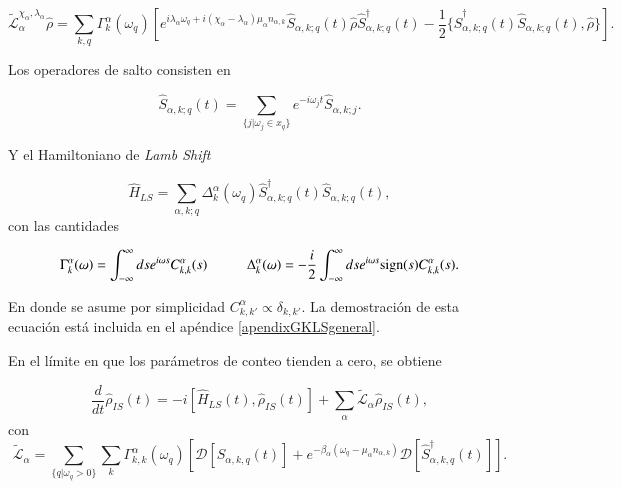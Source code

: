\begin{equation*}
    \tilde{\mathcal{L}}^{\chi_{\alpha},\lambda_{\alpha}}_{\alpha}\hat{\rho} = \sum_{k,q}\Gamma^{\alpha}_{k}(\omega_{q}) \left[e^{i\lambda_{\alpha}\omega_{q} + i(\chi_{\alpha}-\lambda_{\alpha})\mu_{\alpha}n_{\alpha,k}}\hat{S}_{\alpha,k;q}(t)\hat{\rho}\hat{S}^{\dagger}_{\alpha,k;q}(t) - \frac{1}{2}\{\hat{S}^{\dagger}_{\alpha,k;q}(t)\hat{S}_{\alpha,k;q}(t),\hat{\rho} \} \right].
\end{equation*}

Los operadores de salto consisten en

\begin{equation*}
    \hat{S}_{\alpha,k;q}(t) = \sum_{\{j|\omega_{j}\in x_{q} \} } e^{-i\omega_{j}t}\hat{S}_{\alpha,k;j}.
\end{equation*}

Y el Hamiltoniano de \textit{Lamb Shift}

\begin{equation*}
    \hat{H}_{LS} = \sum_{\alpha,k;q} \Delta^{\alpha}_{k}(\omega_{q}) \hat{S}^{\dagger}_{\alpha,k;q}(t)\hat{S}_{\alpha,k;q}(t),
\end{equation*}
con las cantidades

\begin{equation*}
    \Gamma_{k}^{\alpha}(\omega) = \int_{-\infty}^{\infty}ds e^{i\omega s}C^{\alpha}_{k,k}(s) \hspace{10mm} \Delta^{\alpha}_{k}(\omega) = - \frac{i}{2} \int^{\infty}_{-\infty}ds e^{i\omega s} \text{sign}(s)C^{\alpha}_{k,k}(s).
\end{equation*}

En donde se asume por simplicidad $C^{\alpha}_{k,k'} \propto \delta_{k,k'}$. La demostración de esta ecuación está incluida en el apéndice \ref{apendixGKLSgeneral}. 

En el límite en que los parámetros de conteo tienden a cero, se obtiene  

\begin{equation*}
    \frac{d}{dt}\hat{\rho}_{IS}(t) = - i[\hat{H}_{LS}(t),\hat{\rho}_{IS}(t)] + \sum_{\alpha}\tilde{\mathcal{L}}_{\alpha} \hat{\rho}_{IS}(t),
\end{equation*}
con
\begin{equation*}
    \tilde{\mathcal{L}}_{\alpha} = \sum_{\{q|\omega_{q}>0\}} \sum_{k}\Gamma^{\alpha}_{k,k}(\omega_{q}) \left[ \mathcal{D}[\hat{S}_{\alpha,k,q}(t)] + e^{-\beta_{\alpha}(\omega_{q} - \mu_{\alpha}n_{\alpha,k})}\mathcal{D}[\hat{S}^{\dagger}_{\alpha,k,q}(t)]  \right].
\end{equation*}

